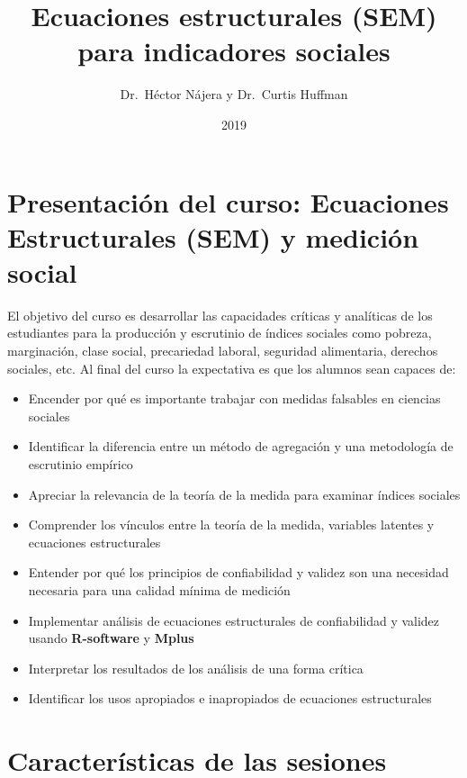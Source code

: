 \documentclass[11pt,]{article}
\title{Ecuaciones estructurales (SEM) para indicadores sociales}
\author{Dr.~Héctor Nájera y Dr.~Curtis Huffman}
\date{2019}
\providecommand{\tightlist}{%
  \setlength{\itemsep}{0pt}\setlength{\parskip}{0pt}}
\begin{document}
\maketitle

{
\setcounter{tocdepth}{2}
\tableofcontents
}
\newpage

\hypertarget{presentacion-del-curso-ecuaciones-estructurales-sem-y-medicion-social}{%
\section{Presentación del curso: Ecuaciones Estructurales (SEM) y
medición
social}\label{presentacion-del-curso-ecuaciones-estructurales-sem-y-medicion-social}}

El objetivo del curso es desarrollar las capacidades críticas y
analíticas de los estudiantes para la producción y escrutinio de índices
sociales como pobreza, marginación, clase social, precariedad laboral,
seguridad alimentaria, derechos sociales, etc. Al final del curso la
expectativa es que los alumnos sean capaces de:

\begin{itemize}
\tightlist
\item
  Encender por qué es importante trabajar con medidas falsables en
  ciencias sociales
\item
  Identificar la diferencia entre un método de agregación y una
  metodología de escrutinio empírico
\item
  Apreciar la relevancia de la teoría de la medida para examinar índices
  sociales
\item
  Comprender los vínculos entre la teoría de la medida, variables
  latentes y ecuaciones estructurales
\item
  Entender por qué los principios de confiabilidad y validez son una
  necesidad necesaria para una calidad mínima de medición
\item
  Implementar análisis de ecuaciones estructurales de confiabilidad y
  validez usando \textbf{R-software} y \textbf{Mplus}
\item
  Interpretar los resultados de los análisis de una forma crítica
\item
  Identificar los usos apropiados e inapropiados de ecuaciones
  estructurales
\end{itemize}

\hypertarget{caracteristicas-de-las-sesiones}{%
\section{Características de las
sesiones}\label{caracteristicas-de-las-sesiones}}
\end{document}

